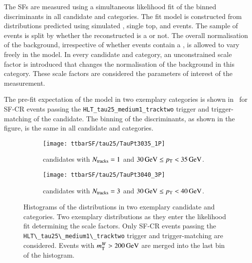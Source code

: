 The \faketauhadvis SFs are measured using a simultaneous likelihood fit of the
binned \mTW discriminants in all \tauhadvis candidate \pT and \Ntracks
categories. The fit model is constructed from \mTW distributions predicted using
simulated \ttbar, single top, and \Vjets events. The sample of \ttbar events is
split by whether the reconstructed is a \faketauhadvis or not. The overall
normalisation of the \ttbar background, irrespective of whether events contain a
\faketauhadvis, is allowed to vary freely in the model. In every \tauhadvis
candidate \pT and \Ntracks category, an unconstrained scale factor is introduced
that changes the normalisation of the \ttbarFakes background in this
category. These \faketauhadvis scale factors are considered the parameters of
interest of the measurement.

The pre-fit expectation of the model in two exemplary categories is shown
in~ for SF-CR events passing the
\verb|HLT_tau25_medium1_tracktwo| trigger and trigger-matching of the \tauhadvis
candidate. The binning of the \mTW discriminants, as shown in the figure, is the
same in all \tauhadvis candidate \pT and \Ntracks categories.

\begin{figure}[htbp]
  \centering

  \begin{subfigure}{.485\textwidth}
    \texttt{[image: ttbarSF/tau25/TauPt3035\_1P]}
    \caption{\tauhadvis candidates with $N_{\text{tracks}} = 1$ and
      $\SI{30}{\ensuremath{\text{GeV}}} \leq p_{\text{T}} < \SI{35}{\ensuremath{\text{GeV}}}$.}
  \end{subfigure}\hfill%
  \begin{subfigure}{.485\textwidth}
    \texttt{[image: ttbarSF/tau25/TauPt3040\_3P]}
    \caption{\tauhadvis candidates with $N_{\text{tracks}} = 3$ and
      $\SI{30}{\GeV} \leq \pT < \SI{40}{\GeV}$.}
  \end{subfigure}

  \caption{Histograms of the \mTW distributions in two exemplary \tauhadvis
    candidate \pT and \Ntracks categories.  Two exemplary \mTW distributions as
    they enter the likelihood fit determining the \faketauhadvis scale
    factors. Only SF-CR events passing the \verb|HLT\_tau25\_medium1\_tracktwo|
    trigger and \tauhadvis trigger-matching are considered. Events with
    $m_{\text{T}}^W > \SI{200}{\ensuremath{\text{GeV}}}$ are merged into the last bin of the histogram.}%
  \label{fig:ttbarsf_mtw_examples_prefit}
\end{figure}


